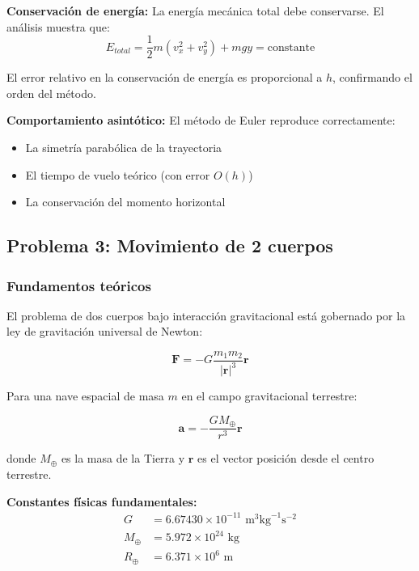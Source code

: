 \documentclass{article}
\begin{document}
	\textbf{Conservación de energía:}
	La energía mecánica total debe conservarse. El análisis muestra que:
	\begin{equation}
		E_{total} = \frac{1}{2}m(v_x^2 + v_y^2) + mgy = \text{constante}
	\end{equation}
	
	El error relativo en la conservación de energía es proporcional a $h$, confirmando el orden del método.
	
	\textbf{Comportamiento asintótico:}
	El método de Euler reproduce correctamente:
	\begin{itemize}
	\item La simetría parabólica de la trayectoria
	\item El tiempo de vuelo teórico (con error $O(h)$)
	\item La conservación del momento horizontal
	\end{itemize}

	\clearpage

	\subsection{Problema 3: Movimiento de 2 cuerpos}
	
	\subsubsection{Fundamentos teóricos}
	
	El problema de dos cuerpos bajo interacción gravitacional está gobernado por la ley de gravitación universal de Newton:
	
	\begin{equation}
		\mathbf{F} = -G\frac{m_1 m_2}{|\mathbf{r}|^3}\mathbf{r}
	\end{equation}
	
	Para una nave espacial de masa $m$ en el campo gravitacional terrestre:
	
	\begin{equation}
		\mathbf{a} = -\frac{GM_{\oplus}}{r^3}\mathbf{r}
	\end{equation}
	
	donde $M_{\oplus}$ es la masa de la Tierra y $\mathbf{r}$ es el vector posición desde el centro terrestre.
	
	\textbf{Constantes físicas fundamentales:}
	\begin{align}
		G &= 6.67430 \times 10^{-11} \text{ m}^3\text{kg}^{-1}\text{s}^{-2} \\
		M_{\oplus} &= 5.972 \times 10^{24} \text{ kg} \\
		R_{\oplus} &= 6.371 \times 10^6 \text{ m}
	\end{align}
	
\end{document}
